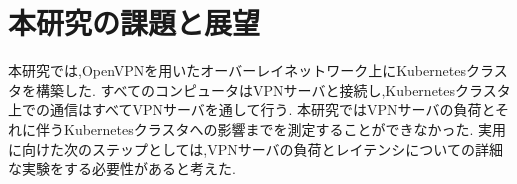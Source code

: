 \section{本研究の課題と展望}
\label{conclusion:issue}

本研究では,OpenVPNを用いたオーバーレイネットワーク上にKubernetesクラスタを構築した.
すべてのコンピュータはVPNサーバと接続し,Kubernetesクラスタ上での通信はすべてVPNサーバを通して行う.
本研究ではVPNサーバの負荷とそれに伴うKubernetesクラスタへの影響までを測定することができなかった.
実用に向けた次のステップとしては,VPNサーバの負荷とレイテンシについての詳細な実験をする必要性があると考えた.

